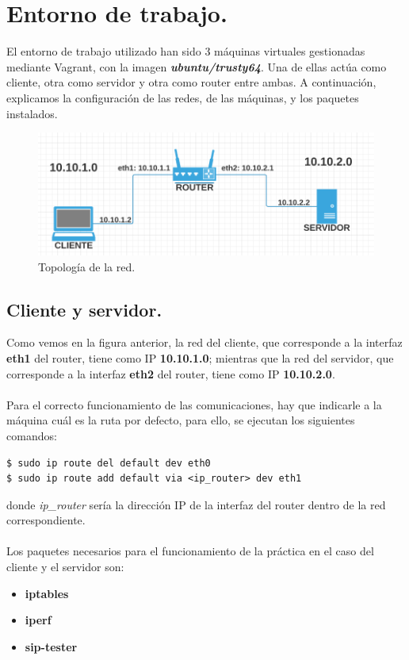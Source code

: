 \documentclass[11pt]{article}
\begin{document}
\section{Entorno de trabajo.}
El entorno de trabajo utilizado han sido 3 máquinas virtuales gestionadas mediante Vagrant, con la imagen \textbf{\textit{ubuntu/trusty64}}. Una de ellas actúa como cliente, otra como servidor y otra como router entre ambas. A continuación, explicamos la configuración de las redes, de las máquinas, y los paquetes instalados.
\begin{figure}[hbtp]
\centering
\includegraphics[scale=0.5]{top.png}
\caption{Topología de la red.}
\end{figure}

\subsection{Cliente y servidor.} 
Como vemos en la figura anterior, la red del cliente, que corresponde a la interfaz \textbf{eth1} del router, tiene como IP \textbf{10.10.1.0}; mientras que la red del servidor, que corresponde a la interfaz \textbf{eth2} del router, tiene como IP \textbf{10.10.2.0}. \\ \\
Para el correcto funcionamiento de las comunicaciones, hay que indicarle a la máquina cuál es la ruta por defecto, para ello, se ejecutan los siguientes comandos:

\begin{lstlisting}[style=C, numbers=none]
$ sudo ip route del default dev eth0
$ sudo ip route add default via <ip_router> dev eth1
\end{lstlisting}
donde \textit{ip\_router} sería la dirección IP de la interfaz del router dentro de la red correspondiente. \\ \\
\newpage
Los paquetes necesarios para el funcionamiento de la práctica en el caso del cliente y el servidor son:
\begin{itemize}
\item \textbf{iptables}
\item \textbf{iperf}
\item \textbf{sip-tester}
\end{itemize}
\end{document}
